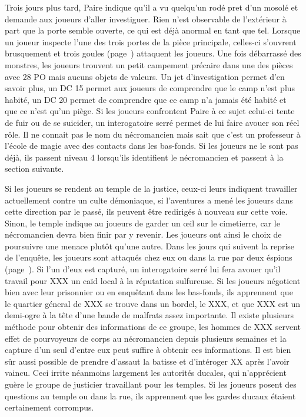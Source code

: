 Trois jours plus tard, Paire indique qu'il a vu quelqu'un rodé pret d'un mosolé et demande aux joueurs 
d'aller investiguer. Rien n'est observable de l'extérieur à part que la porte semble ouverte, ce qui est
déjà anormal en tant que tel. Lorsque un joueur inspecte l'une des trois portes de la pièce principale, 
celles-ci s'ouvrent brusquement et trois goules (page~\pageref{}) attaquent les joueurs. Une fois débarrassé
des monstres, les joueurs trouvent un petit campement précaire dans une des pièces avec 28 PO mais aucuns
objets de valeurs. Un jet d'investigation permet d'en savoir plus, un DC 15 permet aux joueurs de comprendre
que le camp n'est plus habité, un DC 20 permet de comprendre que ce camp n'a jamais été habité et que ce 
n'est qu'un piège. Si les joueurs confrontent Paire à ce sujet celui-ci tente de fuir ou de se suicider,
un interogatoire serré permet de lui faire avouer son réel rôle. Il ne connait pas le nom du nécromancien
mais sait que c'est un professeur à l'école de magie avec des contacts dans les bas-fonds.  Si les joueurs 
ne le sont pas déjà, ils passent niveau 4 lorsqu'ils identifient le nécromancien et passent à la section
suivante.


Si les joueurs se rendent au temple de la justice, ceux-ci leurs indiquent travailler actuellement contre 
un culte démoniaque,
si l'aventures a mené les joueurs dans cette direction par le passé, ils peuvent être redirigés à nouveau 
sur cette voie. Sinon, le temple indique au joueurs de garder un \oe{}il sur le cimetierre, car le 
nécromancien devra bien finir par y revenir. Les joueurs ont ainsi le choix de poursuivre une menace 
plutôt qu'une autre. Dans les jours qui suivent la reprise de l'enquête, les joueurs sont attaqués
chez eux ou dans la rue par deux éspions (page~\pageref{}). Si l'un d'eux est capturé, un interogatoire
serré lui fera avouer qu'il travail pour XXX un caïd local à la réputation sulfureuse. Si les joueurs
négotient bien avec leur prisonnier ou en enquêtant dans les bas-fonds, ils apprennent que le quartier 
géneral de XXX se trouve dans un bordel, le XXX, et que XXX est un demi-ogre à la tête d'une bande de
malfrats assez importante. Il existe plusieurs méthode pour obtenir des informations de ce groupe, les
hommes de XXX servent effet de pourvoyeurs de corps au nécromancien depuis plusieurs semaines et la 
capture d'un
seul d'entre eux peut suffire à obtenir ces informations. Il est bien sûr aussi possible de prendre 
d'assaut la batisse et d'intéroger XX après l'avoir vaincu. Ceci irrite néanmoins largement les 
autorités ducales, qui n'apprécient guère le groupe de justicier travaillant pour les temples. Si les
joueurs posent des questions au temple ou dans la rue, ils apprennent que les gardes ducaux étaient 
certainement corrompus.

